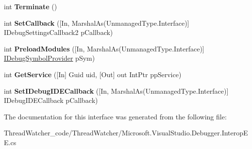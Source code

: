 \begin{DoxyCompactItemize}
\item 
\hypertarget{interface_microsoft_1_1_visual_studio_1_1_debugger_1_1_interop_e_e_1_1_i_debug_expression_evaluator2_a26e0ee35d6eaac14e558eea9b039473b}{int {\bfseries Terminate} ()}\label{interface_microsoft_1_1_visual_studio_1_1_debugger_1_1_interop_e_e_1_1_i_debug_expression_evaluator2_a26e0ee35d6eaac14e558eea9b039473b}

\item 
\hypertarget{interface_microsoft_1_1_visual_studio_1_1_debugger_1_1_interop_e_e_1_1_i_debug_expression_evaluator2_a56910e635213f7382683593e174ef5df}{int {\bfseries Set\+Callback} (\mbox{[}In, Marshal\+As(Unmanaged\+Type.\+Interface)\mbox{]} I\+Debug\+Settings\+Callback2 p\+Callback)}\label{interface_microsoft_1_1_visual_studio_1_1_debugger_1_1_interop_e_e_1_1_i_debug_expression_evaluator2_a56910e635213f7382683593e174ef5df}

\item 
\hypertarget{interface_microsoft_1_1_visual_studio_1_1_debugger_1_1_interop_e_e_1_1_i_debug_expression_evaluator2_a76c2ed6519c10eafba7cc3120e66729b}{int {\bfseries Preload\+Modules} (\mbox{[}In, Marshal\+As(Unmanaged\+Type.\+Interface)\mbox{]} \hyperlink{interface_microsoft_1_1_visual_studio_1_1_debugger_1_1_interop_e_e_1_1_i_debug_symbol_provider}{I\+Debug\+Symbol\+Provider} p\+Sym)}\label{interface_microsoft_1_1_visual_studio_1_1_debugger_1_1_interop_e_e_1_1_i_debug_expression_evaluator2_a76c2ed6519c10eafba7cc3120e66729b}

\item 
\hypertarget{interface_microsoft_1_1_visual_studio_1_1_debugger_1_1_interop_e_e_1_1_i_debug_expression_evaluator2_ab8fd8e60c849c4108fb2856071b34ea7}{int {\bfseries Get\+Service} (\mbox{[}In\mbox{]} Guid uid, \mbox{[}Out\mbox{]} out Int\+Ptr pp\+Service)}\label{interface_microsoft_1_1_visual_studio_1_1_debugger_1_1_interop_e_e_1_1_i_debug_expression_evaluator2_ab8fd8e60c849c4108fb2856071b34ea7}

\item 
\hypertarget{interface_microsoft_1_1_visual_studio_1_1_debugger_1_1_interop_e_e_1_1_i_debug_expression_evaluator2_abf5d73bb2fdc05578106c5cbf6352a75}{int {\bfseries Set\+I\+Debug\+I\+D\+E\+Callback} (\mbox{[}In, Marshal\+As(Unmanaged\+Type.\+Interface)\mbox{]} I\+Debug\+I\+D\+E\+Callback p\+Callback)}\label{interface_microsoft_1_1_visual_studio_1_1_debugger_1_1_interop_e_e_1_1_i_debug_expression_evaluator2_abf5d73bb2fdc05578106c5cbf6352a75}

\end{DoxyCompactItemize}


The documentation for this interface was generated from the following file\+:\begin{DoxyCompactItemize}
\item 
Thread\+Watcher\+\_\+code/\+Thread\+Watcher/Microsoft.\+Visual\+Studio.\+Debugger.\+Interop\+E\+E.\+cs\end{DoxyCompactItemize}
